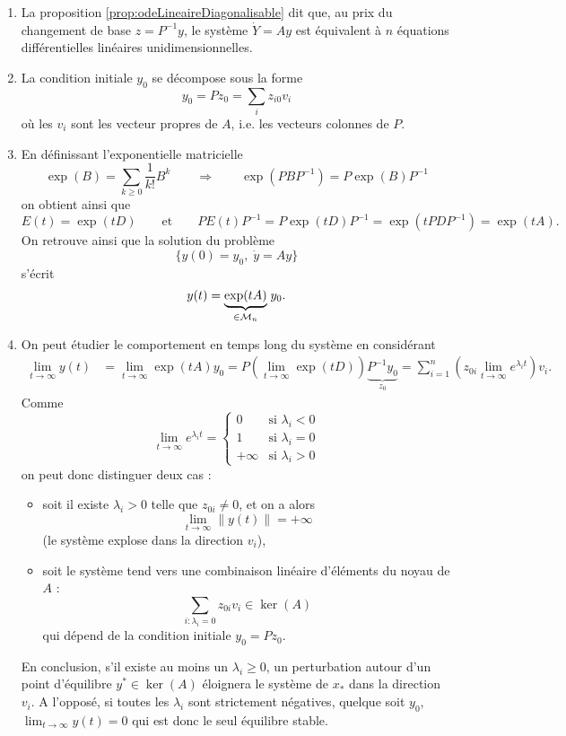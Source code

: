 \remarks
\begin{enumerate}
  \item La proposition \ref{prop:odeLineaireDiagonalisable} dit que, au prix du changement de base $z = P^{-1} y$, le système $\dot Y = A y$ est équivalent à $n$ équations différentielles linéaires unidimensionnelles.
  \item La condition initiale $y_0$ se décompose sous la forme
  $$
  y_0 = P z_0 = \sum_i z_{i0} v_i
  $$
  où les $v_i$ sont les vecteur propres de $A$, i.e. les vecteurs colonnes de $P$.
  \item En définissant l'exponentielle matricielle
  $$
  \exp(B) = \sum_{k \geq 0} \frac1{k!} B^k
  \qquad \Rightarrow \qquad
  \exp(P B P^{-1}) = P \exp(B) P^{-1}
  $$
  on obtient ainsi que
  $$
  E(t) = \exp(t D) 
  \qquad \text{et} \qquad 
  P E(t) P^{-1} = P \exp(t D) P^{-1} = \exp(t P D P^{-1}) = \exp(t A).
  $$
  On retrouve ainsi que la solution du problème
  $$
  \{y(0) = y_0, \; \dot y = A y\}
  $$
  s'écrit
  $$
  y(t) = \underset{\in \mathcal{M}_n}{\underbrace{\exp(t A)}} \; y_0.
  $$
  \item On peut étudier le comportement en temps long du système en considérant
  \begin{align*}
    \lim_{t \rightarrow \infty} y(t)
    & = \lim_{t \rightarrow \infty} \exp(t A) y_0 
    = P \left(\lim_{t \rightarrow \infty} \exp(t D)\right) \underset{z_0}{\underbrace{P^{-1} y_0}}
    = \sum_{i=1}^n \left(z_{0i} \lim_{t \rightarrow \infty} e^{\lambda_i t}\right) v_i.
  \end{align*}
  Comme
  $$
  \lim_{t \rightarrow \infty} e^{\lambda_i t} = 
  \left\{\begin{array}{rr}
          0 & \text{si } \lambda_i < 0 \\
          1 & \text{si } \lambda_i = 0 \\
          +\infty & \text{si } \lambda_i > 0
         \end{array}\right.
  $$
  on peut donc distinguer deux cas : 
  \begin{itemize}
  \item soit il existe $\lambda_i > 0$ telle que $z_{0i} \neq 0$, et on a alors
  $$
  \lim_{t \rightarrow \infty} \|y(t)\| = + \infty
  $$
  (le système explose dans la direction $v_i$), 
  \item soit le système tend vers une combinaison linéaire d'éléments du noyau de $A$ :
  $$
  \sum_{i : \lambda_i = 0} z_{0i} v_i \in \ker(A)
  $$
  qui dépend de la condition initiale $y_0 = P z_0$.
  \end{itemize}
  En conclusion, s'il existe au moins un $\lambda_i \geq 0$, un perturbation autour d'un point d'équilibre $y^* \in \ker(A)$ éloignera le système de $x_ *$ dans la direction $v_i$. A l'opposé, si toutes les $\lambda_i$ sont strictement négatives, quelque soit $y_0$, $\lim_{t \rightarrow \infty} y(t) = 0$ qui est donc le seul équilibre stable.
\end{enumerate}

